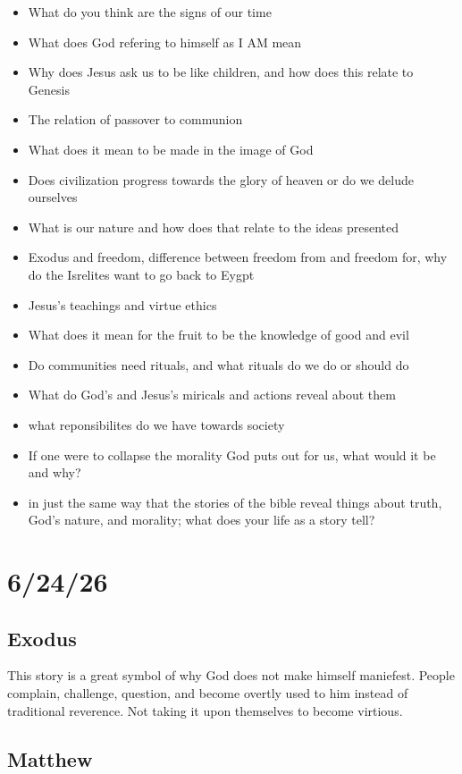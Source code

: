 \begin{itemize}
\item What do you think are the signs of our time
\item What does God refering to himself as I AM mean
\item Why does Jesus ask us to be like children, and how does this relate to Genesis
\item The relation of passover to communion
\item What does it mean to be made in the image of God
\item Does civilization progress towards the glory of heaven or do we delude ourselves
\item What is our nature and how does that relate to the ideas presented
\item Exodus and freedom, difference between freedom from and freedom for, why do the Isrelites want to go back to Eygpt
\item Jesus's teachings and virtue ethics
\item What does it mean for the fruit to be the knowledge of good and evil
\item Do communities need rituals, and what rituals do we do or should do
\item What do God's and Jesus's miricals and actions reveal about them
\item what reponsibilites do we have towards society
\item If one were to collapse the morality God puts out for us, what would it be and why?
\item in just the same way that the stories of the bible reveal things about truth, God's nature, and morality; what does your life as a story tell?
\end{itemize}

\section{6/24/26}
\subsection{Exodus}

This story is a great symbol of why God does not make himself maniefest. People complain, challenge, question, and become overtly used to him instead of traditional reverence. Not taking it upon themselves to become virtious.

\subsection{Matthew}


